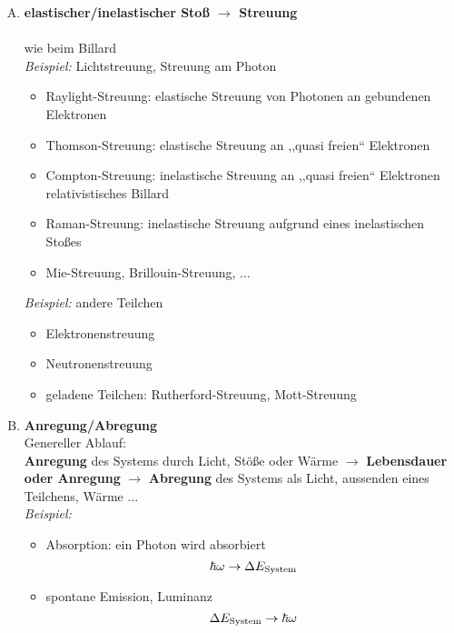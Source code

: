 \begin{enumerate}[A)]
	\item \textbf{ elastischer/inelastischer Stoß $ \rightarrow $ Streuung}\\
	\\
	wie beim Billard\\[5pt]
	\emph{Beispiel:} Lichtstreuung, Streuung am Photon
	\begin{itemize}
		\item Raylight-Streuung: elastische Streuung von Photonen an gebundenen Elektronen
		\item Thomson-Streuung: elastische Streuung an ,,quasi freien`` Elektronen
		\item Compton-Streuung: inelastische Streuung an ,,quasi freien`` Elektronen\\
		relativistisches Billard
		\item Raman-Streuung: inelastische Streuung aufgrund eines inelastischen Stoßes
		\item Mie-Streuung, Brillouin-Streuung, $ \dots $
	\end{itemize}
	\emph{Beispiel:} andere Teilchen
	\begin{itemize}
		\item Elektronenstreuung
		\item Neutronenstreuung
		\item geladene Teilchen: Rutherford-Streuung, Mott-Streuung
	\end{itemize}
	\item \textbf{Anregung/Abregung}\\
	Genereller Ablauf:\\
	\textbf{Anregung} des Systems durch Licht, Stöße oder Wärme $ \rightarrow $ \textbf{Lebensdauer oder Anregung} $ \rightarrow $ \textbf{Abregung} des Systems als Licht, aussenden eines Teilchens, Wärme $ \dots $\\[5pt]
	\emph{Beispiel:}
	\begin{itemize}
		\item Absorption: ein Photon wird absorbiert
		\begin{equation*}
		\hbar \omega \rightarrow \Delta E_{\tx{System}}  %
		\end{equation*}
		\item spontane Emission, Luminanz
		\begin{equation*}
		\Delta E_{\tx{System}} \rightarrow \hbar \omega

\end{equation*}
\end{itemize}
\end{enumerate}
